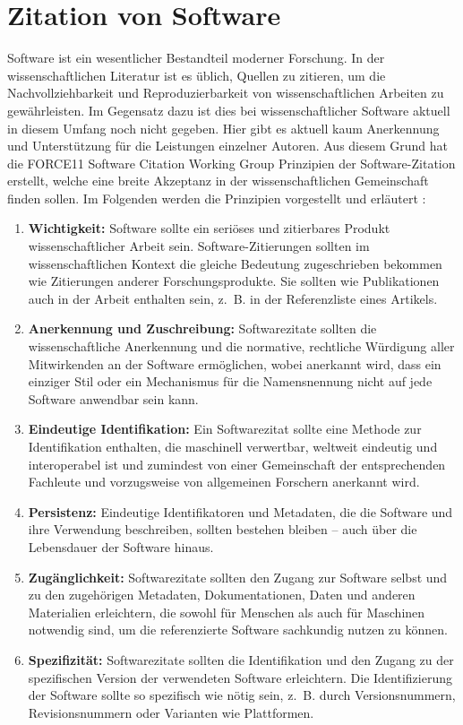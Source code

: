 \section{Zitation von Software}
\label{sec:software-zitation}
Software ist ein wesentlicher Bestandteil moderner Forschung.
In der wissenschaftlichen Literatur ist es üblich, Quellen zu zitieren, um die Nachvollziehbarkeit und Reproduzierbarkeit von wissenschaftlichen Arbeiten zu gewährleisten.
Im Gegensatz dazu ist dies bei wissenschaftlicher Software aktuell in diesem Umfang noch nicht gegeben.
Hier gibt es aktuell kaum Anerkennung und Unterstützung für die Leistungen einzelner Autoren.
Aus diesem Grund hat die \glqq FORCE11 Software Citation Working Group\grqq{} Prinzipien der Software-Zitation erstellt, welche eine breite Akzeptanz in der wissenschaftlichen Gemeinschaft finden sollen.
Im Folgenden werden die Prinzipien vorgestellt und erläutert \autocite{smith_software_2016}:

\begin{enumerate}
    \item \textbf{Wichtigkeit:} Software sollte ein seriöses und zitierbares Produkt wissenschaftlicher Arbeit sein. Software-Zitierungen sollten im wissenschaftlichen Kontext die gleiche Bedeutung zugeschrieben bekommen wie Zitierungen anderer Forschungsprodukte. Sie sollten wie Publikationen auch in der Arbeit enthalten sein, z.~B. in der Referenzliste eines Artikels.
    \item \textbf{Anerkennung und Zuschreibung:} Softwarezitate sollten die wissenschaftliche Anerkennung und die normative, rechtliche Würdigung aller Mitwirkenden an der Software ermöglichen, wobei anerkannt wird, dass ein einziger Stil oder ein Mechanismus für die Namensnennung nicht auf jede Software anwendbar sein kann.
    \item \textbf{Eindeutige Identifikation:} Ein Softwarezitat sollte eine Methode zur Identifikation enthalten, die maschinell verwertbar, weltweit eindeutig und interoperabel ist und zumindest von einer Gemeinschaft der entsprechenden Fachleute und vorzugsweise von allgemeinen Forschern anerkannt wird.
    \item \textbf{Persistenz:} Eindeutige Identifikatoren und Metadaten, die die Software und ihre Verwendung beschreiben, sollten bestehen bleiben – auch über die Lebensdauer der Software hinaus.
    \item \textbf{Zugänglichkeit:} Softwarezitate sollten den Zugang zur Software selbst und zu den zugehörigen Metadaten, Dokumentationen, Daten und anderen Materialien erleichtern, die sowohl für Menschen als auch für Maschinen notwendig sind, um die referenzierte Software sachkundig nutzen zu können.
    \item \textbf{Spezifizität:} Softwarezitate sollten die Identifikation und den Zugang zu der spezifischen Version der verwendeten Software erleichtern. Die Identifizierung der Software sollte so spezifisch wie nötig sein, z.~B. durch Versionsnummern, Revisionsnummern oder Varianten wie Plattformen.
\end{enumerate}

